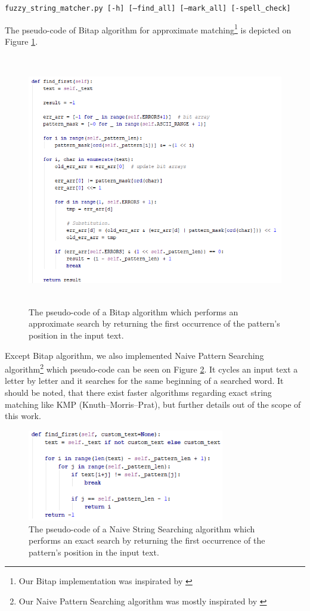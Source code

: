\documentclass[12pt,a4paper,titlepage,final]{article}
\begin{document}
\texttt{fuzzy\_string\_matcher.py [-h] [--find\_all] [--mark\_all] [-spell\_check]}

The pseudo-code of Bitap algorithm for approximate matching\footnote{Our Bitap implementation was inspirated by \cite{bitap}} is depicted on Figure \ref{fig:bitap}.

\begin{figure}[H]
	\centering
	\includegraphics[height=11cm,keepaspectratio]{img/bitap.png}
	\caption{The pseudo-code of a Bitap algorithm which performs an approximate search by returning the first occurrence of the pattern's position in the input text.}
	\label{fig:bitap}
\end{figure}

Except Bitap algorithm, we also implemented Naive Pattern Searching algorithm\footnote{Our Naive Pattern Searching algorithm was mostly inspirated by \cite{naive}} which pseudo-code can be seen on Figure \ref{fig:naive}. It cycles an input text a letter by letter and it searches for the same beginning of a searched word. It should be noted, that there exist faster algorithms regarding exact string matching like KMP (Knuth–Morris–Prat), but further details out of the scope of this work. 

\begin{figure}[H]
	\centering
	\includegraphics[height=4cm,keepaspectratio]{img/naive.png}
	\caption{The pseudo-code of a Naive String Searching algorithm which performs an exact search by returning the first occurrence of the pattern's position in the input text.}
	\label{fig:naive}
\end{figure}
\end{document}
